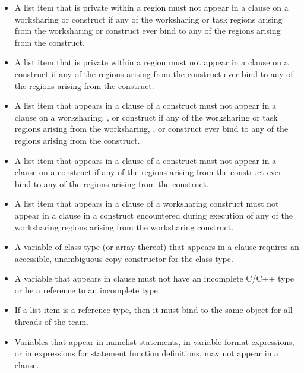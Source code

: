 \begin{itemize}
\item A list item that is private within a  region must
not appear in a  clause on a worksharing or
 construct if any of the worksharing or task regions arising
from the worksharing or  construct ever bind to any of the
 regions arising from the  construct.

\item A list item that is private within a  region must not appear in a 
 clause on a  construct if any of the  
regions arising from the  construct ever bind to any of the  
regions arising from the  construct.

\item A list item that appears in a  clause of a  
construct must not appear in a  clause on a worksharing, , 
or  construct if any of the worksharing or task regions arising from 
the worksharing, , or  construct ever bind to any of the 
 regions arising from the  construct.

\item A list item that appears in a  clause of a  construct must not 
appear in a  clause on a  construct if any of the 
 regions arising from the  construct ever bind to any of 
the  regions arising from the  construct. 

\item A list item that appears in a  clause of a worksharing construct must not 
appear in a  clause in a  construct encountered during execution 
of any of the worksharing regions arising from the worksharing construct.

\cppspecificstart
\item A variable of class type (or array thereof) that appears in a  clause 
requires an accessible, unambiguous copy constructor for the class type.
\cppspecificend

\ccppspecificstart
\item A variable that appears in  clause must not have an incomplete C/C++ type or be a reference to an incomplete type.
\item If a list item is a reference type, then it must bind to the same object for all threads of the team.
\ccppspecificend

\fortranspecificstart
\item Variables that appear in namelist statements, in variable format expressions, or in 
expressions for statement function definitions, may not appear in a  
clause. 
\fortranspecificend
\end{itemize}










